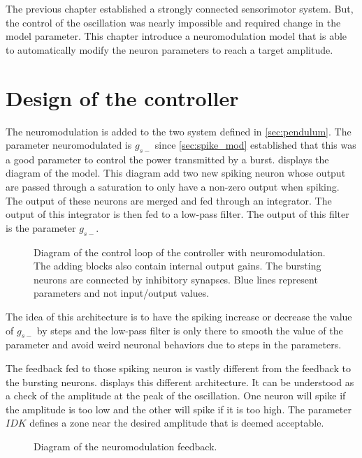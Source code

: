 The previous chapter established a strongly connected sensorimotor system. But, the control of the oscillation was nearly impossible and required change in the model parameter. This chapter introduce a neuromodulation model that is able to automatically modify the neuron parameters to reach a target amplitude. 

\section{Design of the controller}

The neuromodulation is added to the two system defined in \cref{sec:pendulum}. The parameter neuromodulated is $g_{s-}$ since \cref{sec:spike_mod} established that this was a good parameter to control the power transmitted by a burst.  displays the diagram of the model. This diagram add two new spiking neuron whose output are passed through a saturation to only have a non-zero output when spiking. The output of these neurons are merged and fed through an integrator. The output of this integrator is then fed to a low-pass filter. The output of this filter is the parameter $g_{s-}$.
 
\begin{figure}
    \centering
    \caption{Diagram of the control loop of the controller with neuromodulation. The adding blocks also contain internal output gains. The bursting neurons are connected by inhibitory synapses. Blue lines represent parameters and not input/output values.}
    \label{fig:neuromod_motor}
\end{figure}

The idea of this architecture is to have the spiking increase or decrease the value of $g_{s-}$ by steps and the low-pass filter is only there to smooth the value of the parameter and avoid weird neuronal behaviors due to steps in the parameters.

The feedback fed to those spiking neuron is vastly different from the feedback to the bursting neurons.  displays this different architecture. It can be understood as a check of the amplitude at the peak of the oscillation. One neuron will spike if the amplitude is too low and the other will spike if it is too high. The parameter $IDK$ defines a zone near the desired amplitude that is deemed acceptable.
\begin{figure}[htb]
    \centering
    \caption{Diagram of the neuromodulation feedback.}
    \label{fig:neuro_feed}
\end{figure}

